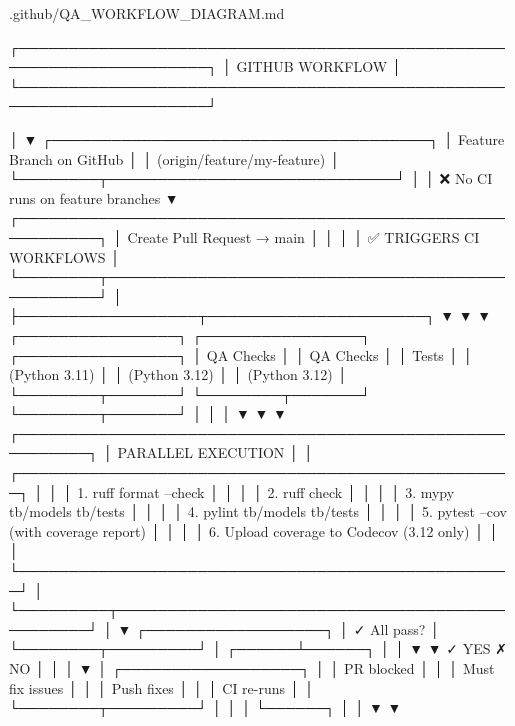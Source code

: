 \begin{relocated}{.github/QA_WORKFLOW_DIAGRAM.md}
\begin{logblock}
┌─────────────────────────────────────────────────────────────────────┐
│                          GITHUB WORKFLOW                            │
└─────────────────────────────────────────────────────────────────────┘

             │
             ▼
    ┌──────────────────────────────────────┐
    │  Feature Branch on GitHub            │
    │  (origin/feature/my-feature)         │
    └────────┬─────────────────────────────┘
             │
             │ ❌ No CI runs on feature branches
             ▼
    ┌──────────────────────────────────────────────────────────┐
    │          Create Pull Request → main                      │
    │                                                          │
    │  ✅ TRIGGERS CI WORKFLOWS                                │
    └────────┬─────────────────────────────────────────────────┘
             │
             ├──────────────────┬──────────────────────┐
             ▼                  ▼                      ▼
    ┌────────────────┐  ┌────────────────┐  ┌────────────────┐
    │ QA Checks      │  │ QA Checks      │  │ Tests          │
    │ (Python 3.11)  │  │ (Python 3.12)  │  │ (Python 3.12)  │
    └────────┬───────┘  └────────┬───────┘  └────────┬───────┘
             │                   │                    │
             ▼                   ▼                    ▼
    ┌─────────────────────────────────────────────────────────┐
    │                   PARALLEL EXECUTION                    │
    │ ┌──────────────────────────────────────────────────┐   │
    │ │ 1. ruff format --check                           │   │
    │ │ 2. ruff check                                    │   │
    │ │ 3. mypy tb/models tb/tests                       │   │
    │ │ 4. pylint tb/models tb/tests                     │   │
    │ │ 5. pytest --cov (with coverage report)           │   │
    │ │ 6. Upload coverage to Codecov (3.12 only)        │   │
    │ └──────────────────────────────────────────────────┘   │
    └─────────┬───────────────────────────────────────────────┘
              │
              ▼
    ┌──────────────────┐
    │  ✓ All pass?     │
    └────────┬─────────┘
             │
      ┌──────┴──────┐
      │             │
      ▼             ▼
   ✓ YES         ✗ NO
      │             │
      │             ▼
      │    ┌──────────────────┐
      │    │  PR blocked      │
      │    │  Must fix issues │
      │    │  Push fixes      │
      │    │  CI re-runs      │
      │    └────────┬─────────┘
      │             │
      │             └──────┐
      │                    │
      ▼                    ▼

\end{logblock}
\end{relocated}

